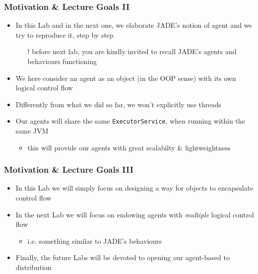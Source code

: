 \documentclass[presentation]{beamer}\mode<presentation>{\usetheme{AMSCesenaPurpleAndGold}}
\begin{document}
\begin{frame}
\frametitle{Motivation \& Lecture Goals II}

\begin{itemize}
	\item In this Lab and in the next one, we elaborate \alert{JADE}'s notion of agent and we try to reproduce it, step by step
	\begin{itemize}
	    \item[!] \alert{before next lab}, you are kindly invited to recall JADE's agents and behaviours functioning
	\end{itemize}
	
	\vfill
	
	\item We here consider an agent as an object (in the OOP sense) with its own \alert{logical} control flow
	
	\vfill
	
	\item Differently from what we did so far, we won't explicitly use \alert{threads}
	
	\vfill
	
	\item Our agents will share the same \texttt{ExecutorService}, when running within the same JVM
	\begin{itemize}
	    \item this will provide our agents with great \alert{scalabilty \& lightweightness}
	\end{itemize}
\end{itemize}

\end{frame}

\begin{frame}
\frametitle{Motivation \& Lecture Goals III}

\begin{itemize}
	\item In this Lab we will simply focus on designing a way for objects to encapsulate control flow
	
	\vfill
	
	\item In the next Lab we will focus on endowing agents with \emph{multiple} \alert{logical} control flow
	\begin{itemize}
	    \item i.e. something similar to JADE's behaviours
	\end{itemize}
	
	\vfill
	
	\item Finally, the future Labs will be devoted to opening our agent-based to \alert{distribution}
	
\end{itemize}

\end{frame}
\end{document}
